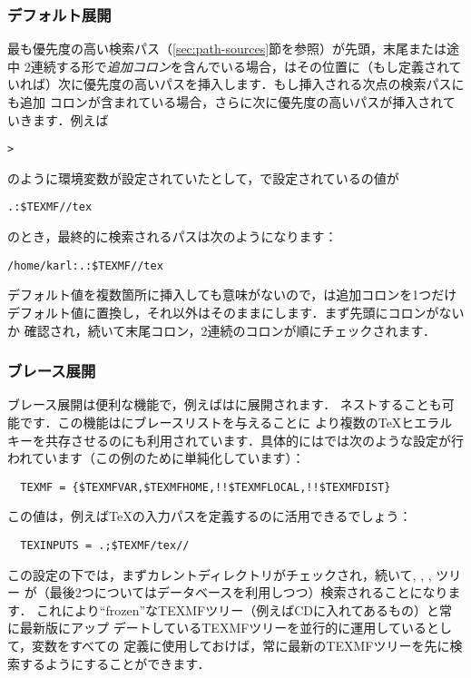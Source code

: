 \documentclass[uplatex,dvipdfmx]{jsarticle}
\begin{document}
\subsubsection{デフォルト展開}
\label{sec:default-expansion}

最も優先度の高い検索パス（\ref{sec:path-sources}節を参照）が先頭，末尾または途中
2連続する形で\emph{追加コロン}を含んでいる場合，\KPS はその位置に（もし定義されて
いれば）次に優先度の高いパスを挿入します．もし挿入される次点の検索パスにも追加
コロンが含まれている場合，さらに次に優先度の高いパスが挿入されていきます．例えば
%
\begin{alltt}
> 
\end{alltt}
%
のように環境変数が設定されていたとして，で設定されているの値が
%
\begin{alltt}
  .:\$TEXMF//tex
\end{alltt}
%
のとき，最終的に検索されるパスは次のようになります：
%
\begin{alltt}
  /home/karl:.:\$TEXMF//tex
\end{alltt}
デフォルト値を複数箇所に挿入しても意味がないので，\KPS は追加コロンを1つだけ
デフォルト値に置換し，それ以外はそのままにします．まず先頭にコロンがないか
確認され，続いて末尾コロン，2連続のコロンが順にチェックされます．

\subsubsection{ブレース展開}
\label{sec:brace-expansion}

ブレース展開は便利な機能で，例えばはに展開されます．
ネストすることも可能です．この機能はにブレースリストを与えることに
より複数の\TeX ヒエラルキーを共存させるのにも利用されています．具体的にはでは次のような設定が行われています（この例のために単純化しています）：
%
\begin{verbatim}
  TEXMF = {$TEXMFVAR,$TEXMFHOME,!!$TEXMFLOCAL,!!$TEXMFDIST}
\end{verbatim}
%
この値は，例えば\TeX の入力パスを定義するのに活用できるでしょう：
%
\begin{verbatim}
  TEXINPUTS = .;$TEXMF/tex//
\end{verbatim}
%
この設定の下では，まずカレントディレクトリがチェックされ，続いて, , , ツリー
が（最後2つについてはデータベースを利用しつつ）検索されることになります．
これにより``frozen''なTEXMFツリー（例えばCDに入れてあるもの）と常に最新版にアップ
デートしているTEXMFツリーを並行的に運用しているとして，変数をすべての
定義に使用しておけば，常に最新のTEXMFツリーを先に検索するようにすることができます．
\end{document}
